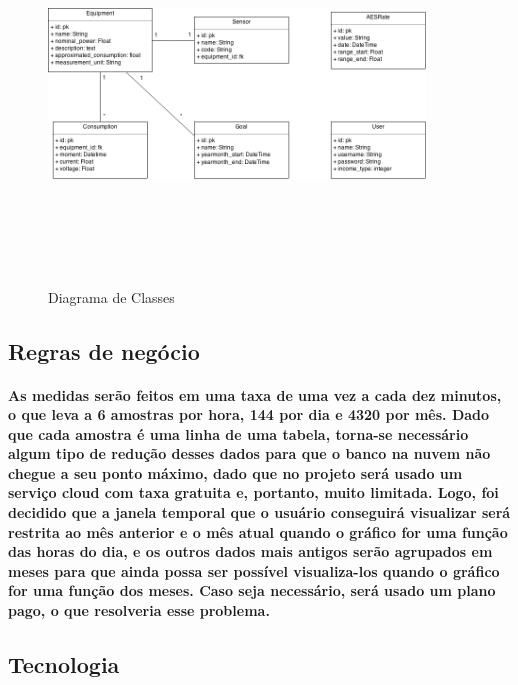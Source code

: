 \begin{figure}[H]
\begin{center}
\includegraphics[width=10cm,height=10cm,keepaspectratio]{figuras/diagrama_classes.png}
\caption{\label{fig:diagrama classes} Diagrama de Classes}
\end{center}
\end{figure}

\subsection{Regras de negócio}
\paragraph{As medidas serão feitos em uma taxa de uma vez a cada dez minutos, o que leva a 6 amostras por hora, 144 por dia e 4320 por mês. Dado que cada amostra é uma linha de uma tabela, torna-se necessário algum tipo de redução desses dados para que o banco na nuvem não chegue a seu ponto máximo, dado que no projeto será usado um serviço cloud com taxa gratuita e, portanto, muito limitada. Logo, foi decidido que a janela temporal que o usuário conseguirá visualizar será restrita ao mês anterior e o mês atual quando o gráfico for uma função das horas do dia, e os outros dados mais antigos serão agrupados em meses para que ainda possa ser possível visualiza-los quando o gráfico for uma função dos meses. Caso seja necessário, será usado um plano pago, o que resolveria esse problema.
}

\subsection{Tecnologia}
